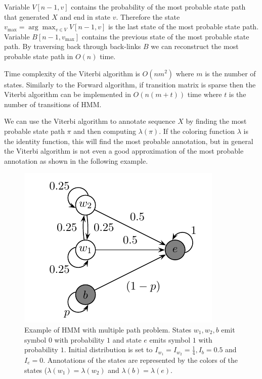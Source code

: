 Variable $V[n-1,v]$ contains the probability of the most probable state path
that generated $X$ and end in state $v$. Therefore the state $v_{\max} =
\arg\max_{v\in V}V[n-1,v]$ is the last state of the most probable state path.
Variable $B[n-1,v_{\max}]$ contains the previous state of the most probable
state path. By traversing back through back-links $B$ we can reconstruct the most
probable state path in $O(n)$ time.

Time complexity of the Viterbi algorithm is $O(nm^2)$ where $m$ is the number of
states. Similarly to the Forward algorithm, if transition matrix is sparse then 
the Viterbi algorithm can be implemented in $O(n(m+t))$ time where $t$ is the
number of transitions of HMM.


We can use the Viterbi algorithm to annotate sequence $X$ by finding the most
probable state path $\pi$ and then computing $\lambda(\pi)$. If the  coloring
function $\lambda$ is the identity function, this will find the most probable
annotation, but in general the Viterbi algorithm is not even a good approximation of
the most probable annotation as shown in the following example.

\begin{figure}
\begin{center}
\includegraphics{../figures/multiplePathProblemHMM.pdf}
\end{center}
\caption[Hidden Markov Model with multiple path problem.]{Example of HMM with
multiple path problem. States $w_1,w_2,b$ emit symbol $0$ with probability $1$
and state $e$ emits symbol $1$ with probability $1$. Initial distribution is set
to $I_{w_1}=I_{w_2}=\frac14, I_{b}=0.5$
and $I_e=0$. Annotations of the states are represented by the colors of the states
($\lambda(w_1)=\lambda(w_2)$ and $\lambda(b)=\lambda(e)$. }\label{FIGURE:BADVITERBIEXAMPLE}
\end{figure}

